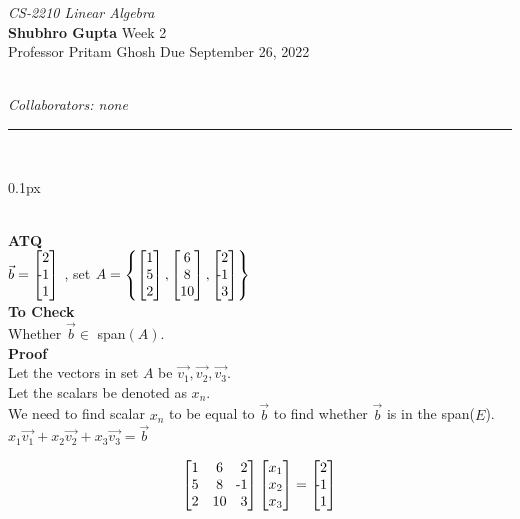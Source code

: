 \documentclass[11pt]{article}
\newcommand{\problem}[1]{\begin{adjustwidth}{0.1px}\noindent \framebox[1.2\width]{\large Problem #1}\end{adjustwidth} \bigskip\\}
\newcommand{\lesgo}[5]{
\begin{large}
\emph{#1}\smallskip \\
\textbf{Shubhro Gupta} \hfill Week #2\smallskip \\
Professor #3 \hfill Due #4\\
\end{large} \medskip \\
{\emph{Collaborators: #5}}\\
\hrule
\vspace{50px}
\\
}
\begin{document}
\lesgo{CS-2210 Linear Algebra}{2}{Pritam Ghosh}{September 26, 2022}{none}

\problem{2.a}
\textbf{ATQ}\medskip
\\
$\vec{b} = \begin{bmatrix}
        2 \\
        \llap{-}1 \\
        1
    \end{bmatrix}
$
, set 
$
A = \left\{ \begin{bmatrix}
        1 \\
        5 \\
        2
    \end{bmatrix}, \begin{bmatrix}
        6 \\
        8 \\
        10
    \end{bmatrix}, \begin{bmatrix}
        2\\
        \llap{-}1\\
        3
    \end{bmatrix} 
    \right\}
$
\bigskip
\\
\textbf{To Check}\\
Whether $\vec{b} \in$  span$(A)$.
\bigskip
\\
\textbf{Proof}\\
Let the vectors in set $A$ be $\vec{v_1}, \vec{v_2}, \vec{v_3}$.\\
Let the scalars be denoted as $x_n$.\\
We need to find scalar $x_n$ to be equal to $\vec{b}$ to find whether $\vec{b}$ is in the span($E$).\\
$x_1\vec{v_1} + x_2\vec{v_2} + x_3\vec{v_3} = \vec{b}$
\
\begin{center}
\end{center}
\vspace*{-\baselineskip}
\begin{align*}
    \begin{bmatrix}
    1 & 6 & 2\\
    5 & 8 & \llap{-}1\\
    2 & 10 & 3
    \end{bmatrix}
    \begin{bmatrix}
    x_1 \\
    x_2 \\
    x_3
    \end{bmatrix}
    =
    \begin{bmatrix}
    2 \\
    \llap{-}1 \\
    1
    \end{bmatrix}
\end{align*}
\end{document}
